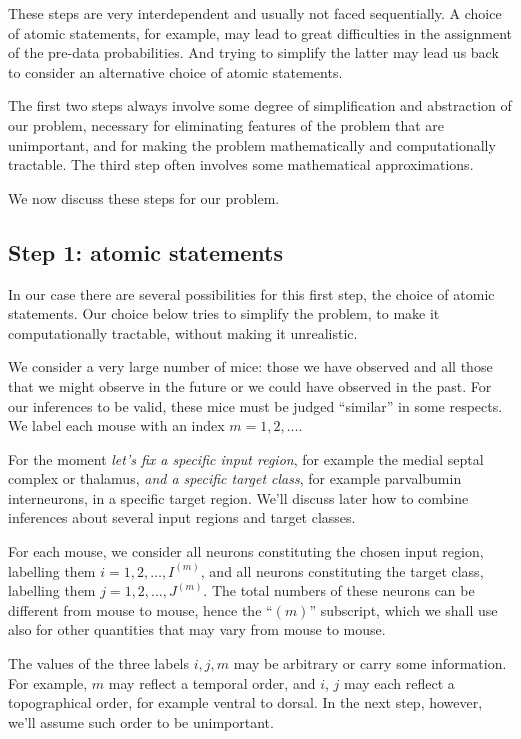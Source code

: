 \documentclass[\ifafour a4paper,12pt,\else a5paper,10pt,\fi%
onecolumn,oneside,article,%
british%
]{memoir}
\theoremstyle{remark}
\theoremstyle{innote}
\renewcommand*{\|}[1][]{\nonscript\,#1\vert\nonscript\;\mathopen{}}
\newcommand*{\yIm}[1][m]{I^{(#1)}}
\newcommand*{\yJm}[1][m]{J^{(#1)}}
\begin{document}
These steps are very interdependent and usually not faced sequentially. A
choice of atomic statements, for example, may lead to great difficulties in
the assignment of the pre-data probabilities. And trying to simplify the
latter may lead us back to consider an alternative choice of atomic
statements.

The first two steps always involve some degree of simplification and
abstraction of our problem, necessary for eliminating features of the
problem that are unimportant, and for making the problem mathematically and
computationally tractable. The third step often involves some mathematical
approximations.


\medskip

We now discuss these steps for our problem.


\subsection{Step 1: atomic statements}
\label{sec:step_statements}

In our case there are several possibilities for this first step, the choice
of atomic statements. Our choice below tries to simplify the problem, to
make it computationally tractable, without making it unrealistic.

We consider a very large number of mice: those we have observed and all
those that we might observe in the future or we could have observed in the
past. For our inferences to be valid, these mice must be judged
\enquote{similar} in some respects. We label each mouse with an index
$m=1,2,\dotsc$.

For the moment \emph{let's fix a specific input region}, for example the
medial septal complex or thalamus, \emph{and a specific target class}, for
example parvalbumin interneurons, in a specific target region. We'll
discuss later how to combine inferences about several input regions and target
classes.

For each mouse, we consider all neurons constituting the chosen input
region, labelling them $i=1,2,\dotsc, \yIm$, and all neurons constituting
the target class, labelling them $j=1,2,\dotsc, \yJm$. The total numbers
of these neurons can be different from mouse to mouse, hence the 
\enquote{$(m)$} subscript, which we shall use also for other quantities
that may vary from mouse to mouse.

The values of the three labels $i,j,m$ may be arbitrary or carry some
information. For example, $m$ may reflect a temporal order, and $i$, $j$
may each reflect a topographical order, for example ventral to dorsal. In
the next step, however, we'll assume such order to be unimportant.
\end{document}
